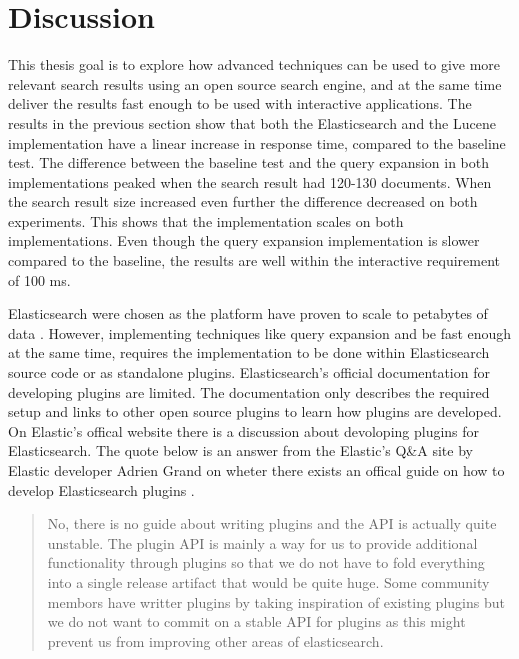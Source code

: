 \section{Discussion}
\label{sec:discussion}
This thesis goal is to explore how advanced techniques can be used to give more relevant search results using an open source search engine,
and at the same time deliver the results fast enough to be used with interactive applications.
The results in the previous section show that both the Elasticsearch and the Lucene implementation have a linear increase in response time,
compared to the baseline test.
The difference between the baseline test and the query expansion in both implementations peaked when the search result had 120-130 documents.
When the search result size increased even further the difference decreased on both experiments.
This shows that the implementation scales on both implementations.
Even though the query expansion implementation is slower compared to the baseline,
the results are well within the interactive requirement of 100 ms.

Elasticsearch were chosen as the platform have proven to scale to petabytes of data \cite{elasticsearch-scale}.
However,
implementing techniques like query expansion and be fast enough at the same time,
requires the implementation to be done within Elasticsearch source code or as standalone plugins.
Elasticsearch's official documentation \cite{elasticsearch-plugin-documentation} for developing plugins are limited.
The documentation only describes the required setup and links to other open source plugins to learn how plugins are developed.
On Elastic's offical website there is a discussion about devoloping plugins for Elasticsearch.
The quote below is an answer from the Elastic's Q\&A site by Elastic developer Adrien Grand on wheter there exists an offical guide on how to develop Elasticsearch plugins \cite{elasticsearch-plugin-quote}.

\begin{quote}
  No, there is no guide about writing plugins and the API is actually quite unstable.
  The plugin API is mainly a way for us to provide additional functionality through plugins so that we do not have to fold everything into a single release artifact that would be quite huge.
  Some community membors have writter plugins by taking inspiration of existing plugins but we do not want to commit on a stable API for plugins as this might prevent us from improving other areas of elasticsearch.
\end{quote}

